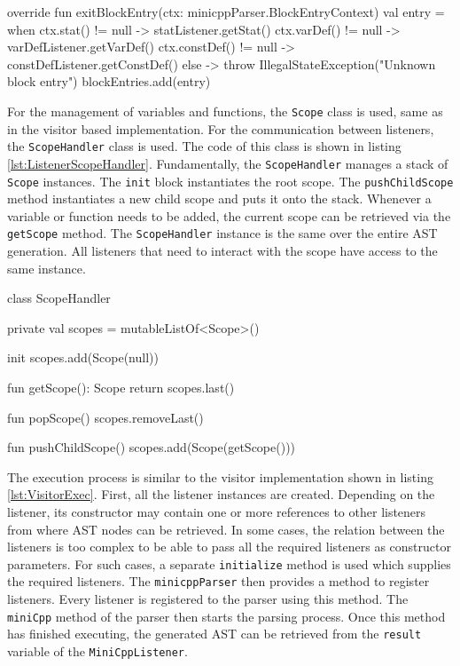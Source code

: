 \begin{KotlinCode}[float,numbers=none,caption=Implementation of the \texttt{exitBlockEntry} method., label=lst:ListenerBlockEntryExit]
    override fun exitBlockEntry(ctx: minicppParser.BlockEntryContext) {
        val entry = when {
            ctx.stat() != null -> statListener.getStat()
            ctx.varDef() != null -> varDefListener.getVarDef()
            ctx.constDef() != null -> constDefListener.getConstDef()
            else -> throw IllegalStateException("Unknown block entry")
        }
        blockEntries.add(entry)
    }
\end{KotlinCode}

For the management of variables and functions, the \verb|Scope| class is used, same as in the visitor based implementation. For the communication between listeners, the \verb|ScopeHandler| class is used. The code of this class is shown in listing \ref{lst:ListenerScopeHandler}. Fundamentally, the \verb|ScopeHandler| manages a stack of \verb|Scope| instances. The \verb|init| block instantiates the root scope. The \verb|pushChildScope| method instantiates a new child scope and puts it onto the stack. Whenever a variable or function needs to be added, the current scope can be retrieved via the \verb|getScope| method. The \verb|ScopeHandler| instance is the same over the entire AST generation. All listeners that need to interact with the scope have access to the same instance. 


\begin{KotlinCode}[float,numbers=none,caption=Implementation of the \texttt{ScopeHandler} class., label=lst:ListenerScopeHandler]
class ScopeHandler {

    private val scopes = mutableListOf<Scope>()

    init {
        scopes.add(Scope(null))
    }

    fun getScope(): Scope {
        return scopes.last()
    }

    fun popScope() {
        scopes.removeLast()
    }

    fun pushChildScope() {
        scopes.add(Scope(getScope()))
    }
}
\end{KotlinCode}

The execution process is similar to the visitor implementation shown in listing \ref{lst:VisitorExec}. First, all the listener instances are created. Depending on the listener, its constructor may contain one or more references to other listeners from where AST nodes can be retrieved. In some cases, the relation between the listeners is too complex to be able to pass all the required listeners as constructor parameters. For such cases, a separate \verb|initialize| method is used which supplies the required listeners. The \verb|minicppParser| then provides a method to register listeners. Every listener is registered to the parser using this method. The \verb|miniCpp| method of the parser then starts the parsing process. Once this method has finished executing, the generated AST can be retrieved from the \verb|result| variable of the \verb|MiniCppListener|.

